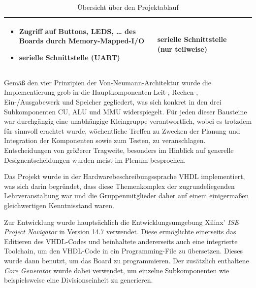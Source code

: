 \begin{table}[H]
\begin{tabular}{|p{50pt}|p{80pt}|p{220pt}|p{110pt}|}
\begin{itemize}[noitemsep,topsep=0pt]
                                                       \item Zugriff auf Buttons, LEDS, \dots{} des Boards durch Memory-Mapped-I/O
                                                       \item serielle Schnittstelle (UART)
                                                       \end{itemize}                                                                    & serielle Schnittstelle (nur teilweise)        \\
\hline
\end{tabular}
\caption{\"Ubersicht \"uber den Projektablauf}
\end{table}

Gem\"a\ss{} den vier Prinzipien der Von-Neumann-Architektur wurde die
Implementierung grob in die Hauptkomponenten Leit-, Rechen-,
Ein-/Ausgabewerk und Speicher gegliedert, was sich konkret in den drei
Subkomponenten CU, ALU und MMU widerspiegelt. F\"ur jeden dieser
Bausteine war durchg\"angig eine unabh\"angige Kleingruppe verantwortlich,
wobei es trotzdem f\"ur sinnvoll erachtet wurde, w\"ochentliche Treffen zu
Zwecken der Planung und Integration der Komponenten sowie zum Testen, zu
veranschlagen. Entscheidungen von gr\"o\ss{}erer Tragweite, besonders im
Hinblick auf generelle Designentscheidungen wurden meist im Plenum besprochen.

Das Projekt wurde in der Hardwarebeschreibungssprache VHDL implementiert, was
sich darin begr\"undet, dass diese Themenkomplex der zugrundeliegenden
Lehrveranstaltung war und die Gruppenmitglieder daher auf einem
einigerma\ss{}en gleichwertigen Kenntnisstand waren.

Zur Entwicklung wurde haupts\"achlich die Entwicklungsumgebung Xilinx'
\textit{ISE Project Navigator} in Version 14.7 verwendet. Diese erm\"oglichte
einerseits das Editieren des VHDL-Codes und beinhaltete andererseits auch eine
integrierte Toolchain, um den VHDL-Code in ein Programming-File zu
\"ubersetzen. Dieses wurde dann benutzt, um das Board zu programmieren. Der
zus\"atzlich enthaltene \textit{Core Generator} wurde dabei verwendet, um
einzelne Subkomponenten wie beispielsweise eine Divisionseinheit zu generieren.

